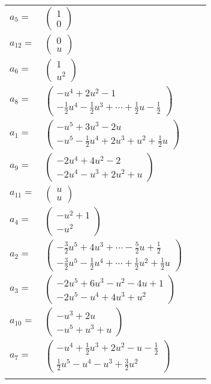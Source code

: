\documentclass[1p]{elsarticle_modified}
\theoremstyle{definition}
\begin{document}
\begin{tabular}{m{7pt} m{180pt} m{7pt} m{180pt} }
\flushright $a_{5}=$&$\begin{pmatrix}1\\0\end{pmatrix}$ \\
\flushright $a_{12}=$&$\begin{pmatrix}0\\u\end{pmatrix}$ \\
\flushright $a_{6}=$&$\begin{pmatrix}1\\u^2\end{pmatrix}$ \\
\flushright $a_{8}=$&$\begin{pmatrix}- u^4+2 u^2-1\\-\frac{1}{2} u^4-\frac{1}{2} u^3+\cdots+\frac{1}{2} u-\frac{1}{2}\end{pmatrix}$ \\
\flushright $a_{1}=$&$\begin{pmatrix}- u^5+3 u^3-2 u\\- u^5-\frac{1}{2} u^4+2 u^3+u^2+\frac{1}{2} u\end{pmatrix}$ \\
\flushright $a_{9}=$&$\begin{pmatrix}-2 u^4+4 u^2-2\\-2 u^4- u^3+2 u^2+u\end{pmatrix}$ \\
\flushright $a_{11}=$&$\begin{pmatrix}u\\u\end{pmatrix}$ \\
\flushright $a_{4}=$&$\begin{pmatrix}- u^2+1\\- u^2\end{pmatrix}$ \\
\flushright $a_{2}=$&$\begin{pmatrix}-\frac{3}{2} u^5+4 u^3+\cdots-\frac{5}{2} u+\frac{1}{2}\\-\frac{3}{2} u^5-\frac{1}{2} u^4+\cdots+\frac{1}{2} u^2+\frac{1}{2} u\end{pmatrix}$ \\
\flushright $a_{3}=$&$\begin{pmatrix}-2 u^5+6 u^3- u^2-4 u+1\\-2 u^5- u^4+4 u^3+u^2\end{pmatrix}$ \\
\flushright $a_{10}=$&$\begin{pmatrix}- u^3+2 u\\- u^5+u^3+u\end{pmatrix}$ \\
\flushright $a_{7}=$&$\begin{pmatrix}- u^4+\frac{1}{2} u^3+2 u^2- u-\frac{1}{2}\\\frac{1}{2} u^5- u^4- u^3+\frac{3}{2} u^2\end{pmatrix}$\\&\end{tabular}
\end{document}
